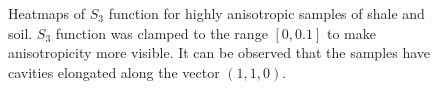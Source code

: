 \documentclass[1p]{elsarticle}
\begin{document}
\begin{figure}[tp]
  \centering
  \hfill
  \hfill
  \caption[]{Heatmaps of $S_3$ function for highly anisotropic samples of shale
    and soil. $S_3$ function was clamped to the range $[0, 0.1]$ to make
    anisotropicity more visible. It can be observed that the samples have
    cavities elongated along the vector $(1, 1, 0)$.}
  \label{fig:heatmaps}
\end{figure}
\end{document}
